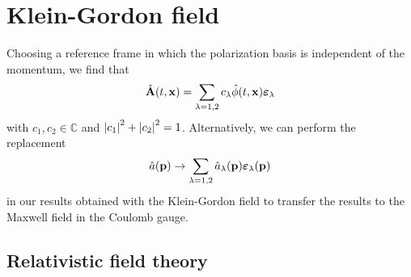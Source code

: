 \section{Klein-Gordon field}

Choosing a reference frame in which the polarization basis is independent of the momentum, we find that
\begin{equation}
	\hat{\vb{A}}(t,\vb{x})
	=
	\sum_{\lambda=1,2}
	c_\lambda
	\hat\phi(t,\vb{x})
	\boldsymbol{\varepsilon}_\lambda
\end{equation}
with $c_1,c_2\in\mathbb{C}$ and $\abs{c_1}^2+\abs{c_2}^2=1$.
Alternatively, we can perform the replacement
\begin{equation}
	\hat{a}(\vb{p})
	\to
	\sum_{\lambda=1,2}
	\hat{a}_\lambda(\vb{p})
	\boldsymbol{\varepsilon}_\lambda(\vb{p})
\end{equation}
in our results obtained with the Klein-Gordon field to transfer the results to the Maxwell field in the Coulomb gauge.

\subsection{Relativistic field theory}

